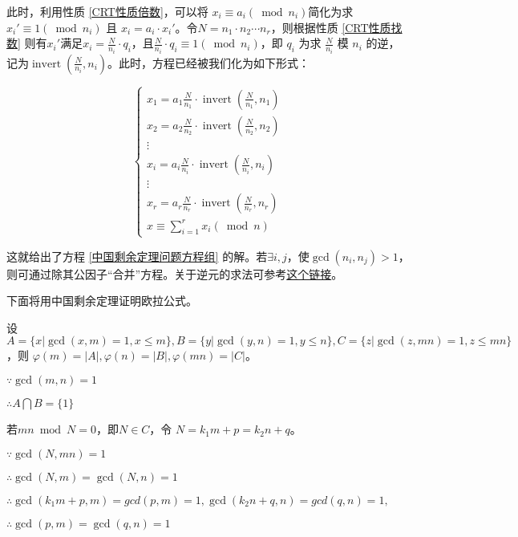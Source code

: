\documentclass[a4paper]{article}         %
\newcommand{\upcite}[1]{\textsuperscript{\cite{#1}}} %
\begin{document}
此时，利用性质 \ref{CRT性质倍数}，可以将 $x_i \equiv a_i(\bmod n_i)$简化为求$x_i' \equiv 1 (\bmod n_i)$ 且 $x_i = a_i \cdot x_i'$。令$N=n_1 \cdot n_2 \cdots n_r$，则根据性质 \ref{CRT性质找数} 则有$x_i'$满足$x_i = \frac{N}{n_i} \cdot q_i$，且$\frac{N}{n_i} \cdot q_i \equiv 1 (\bmod n_i)$，即 $q_i$ 为求 $\frac{N}{n_i}$ 模 $n_i$ 的逆，记为$\operatorname{invert}(\frac{N}{n_i}, n_i)$\upcite{中国剩余定理(CRT)}。此时，方程已经被我们化为如下形式：

\[
	\begin{cases}
		x_1 = a_1\frac{N}{n_1} \cdot \operatorname{invert}(\frac{N}{n_1}, n_1)\\
        x_2 = a_2\frac{N}{n_2} \cdot \operatorname{invert}(\frac{N}{n_2}, n_2)\\
        \vdots                                      \\
        x_i = a_i\frac{N}{n_i} \cdot \operatorname{invert}(\frac{N}{n_i}, n_i) \\
        \vdots                                      \\
        x_r = a_r\frac{N}{n_r} \cdot \operatorname{invert}(\frac{N}{n_r}, n_r)\\
        x \equiv \sum \limits_{i=1}^{r} x_i(\bmod n)
	\end{cases}
\]

这就给出了方程 \ref{中国剩余定理问题方程组} 的解。若$\exists i, j$，使$\gcd(n_i, n_j) > 1$，则可通过除其公因子“合并”方程。关于逆元的求法可参考\href{https://blog.csdn.net/xiaoming_p/article/details/79644386}{这个链接}。

下面将用中国剩余定理证明欧拉公式。

设$A = \{ x \vert \gcd(x, m) = 1, x \leqslant m \}, B = \{ y \vert \gcd(y, n) = 1, y \leqslant n \}, C = \{ z \vert \gcd(z, mn) = 1, z \leqslant mn \}$，则 $\varphi(m) = \left\lvert A\right\rvert,\varphi(n) = \left\lvert B\right\rvert,\varphi(mn) = \left\lvert C\right\rvert$。

$\because \gcd(m, n) = 1$

$\therefore A \bigcap B = \{ 1 \}$

若$mn \bmod N = 0$，即$N \in C$，令 $N = k_1m + p = k_2n + q$。

$\because \gcd(N, mn) = 1$

$\therefore \gcd(N, m) = \gcd(N, n) = 1$

$\therefore \gcd(k_1m + p, m) = gcd(p, m) = 1, \gcd(k_2n + q, n) = gcd(q, n) = 1,$

$\therefore \gcd(p, m) = \gcd(q, n) = 1$
\end{document}
